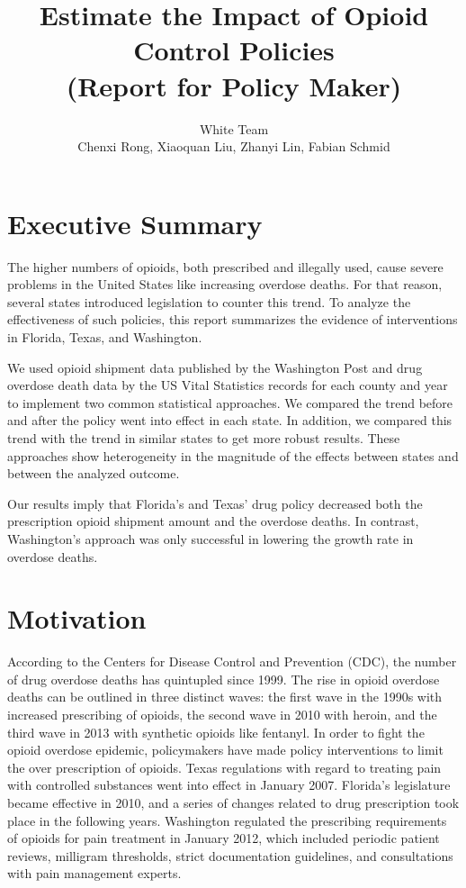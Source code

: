 \documentclass[12pt,letterpaper]{article}
\author{White Team \\ Chenxi Rong, Xiaoquan Liu, Zhanyi Lin, Fabian Schmid}
\title{Estimate the Impact of Opioid Control Policies \\ (Report for Policy Maker)}
\begin{document}
\maketitle

\section*{Executive Summary}

The higher numbers of opioids, both prescribed and illegally used, cause severe problems in the United States like increasing overdose deaths. For that reason, several states introduced legislation to counter this trend. To analyze the effectiveness of such policies, this report summarizes the evidence of interventions in Florida, Texas, and Washington. 

We used opioid shipment data published by the Washington Post and drug overdose death data by the US Vital Statistics records for each county and year to implement two common statistical approaches. We compared the trend before and after the policy went into effect in each state. In addition, we compared this trend with the trend in similar states to get more robust results. These approaches show heterogeneity in the magnitude of the effects between states and between the analyzed outcome. 

Our results imply that Florida's and Texas' drug policy decreased both the prescription opioid shipment amount and the overdose deaths. In contrast, Washington's approach was only successful in lowering the growth rate in overdose deaths.

\section{Motivation}
According to the Centers for Disease Control and Prevention (CDC), the number of drug overdose deaths has quintupled since 1999. The rise in opioid overdose deaths can be outlined in three distinct waves: the first wave in the 1990s with increased prescribing of opioids, the second wave in 2010 with heroin, and the third wave in 2013 with synthetic opioids like fentanyl. In order to fight the opioid overdose epidemic, policymakers have made policy interventions to limit the over prescription of opioids. Texas regulations with regard to treating pain with controlled substances went into effect in January 2007. Florida's legislature became effective in 2010, and a series of changes related to drug prescription took place in the following years. Washington regulated the prescribing requirements of opioids for pain treatment in January 2012, which included periodic patient reviews, milligram thresholds, strict documentation guidelines, and consultations with pain management experts.
\end{document}
